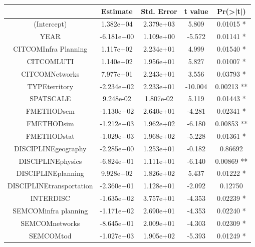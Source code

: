 \begin{table}[h!]
\begin{tabular}{|c|c|c|c|c|}
\hline
 &     Estimate & Std. Error & t value & Pr(>|t|)   \\\hline
(Intercept)           &    1.382e+04 &  2.379e+03 &  5.809 & 0.01015 * \\
YEAR                   &  -6.181e+00 &  1.109e+00 & -5.572 & 0.01141 * \\
CITCOMInfra Planning   &   1.117e+02 &  2.234e+01 &  4.999 & 0.01540 * \\
CITCOMLUTI             &   1.140e+02 & 1.956e+01  & 5.827 & 0.01007 * \\
CITCOMNetworks         &   7.977e+01 & 2.243e+01 &  3.556 & 0.03793 * \\
TYPEterritory          &  -2.234e+02 & 2.233e+01 & -10.004 & 0.00213 ** \\
SPATSCALE              &   9.248e-02 & 1.807e-02 &  5.119 & 0.01443 * \\
FMETHODsem             &  -1.130e+02 & 2.640e+01 &  -4.281 & 0.02341 * \\
FMETHODsim             &  -1.212e+03 & 1.962e+02 & -6.180 & 0.00853 **\\
FMETHODstat            &  -1.029e+03 & 1.968e+02 & -5.228 & 0.01361 * \\
DISCIPLINEgeography    &  -2.285e+00 & 1.253e+01 & -0.182 & 0.86692   \\
DISCIPLINEphysics      &  -6.824e+01 & 1.111e+01 & -6.140 & 0.00869 **\\
DISCIPLINEplanning     &   9.928e+02 & 1.826e+02  & 5.437 & 0.01222 * \\
DISCIPLINEtransportation & -2.360e+01 & 1.128e+01 & -2.092 & 0.12750   \\
INTERDISC             &   -1.635e+02 & 3.757e+01 & -4.353 & 0.02239 * \\
SEMCOMinfra planning  &   -1.171e+02 & 2.690e+01 & -4.353 & 0.02240 * \\
SEMCOMnetworks        &   -8.645e+01 & 2.009e+01 & -4.303 & 0.02309 * \\
SEMCOMtod             &   -1.027e+03 & 1.905e+02 & -5.393 & 0.01249 * \\\hline
\end{tabular}
\end{table}




